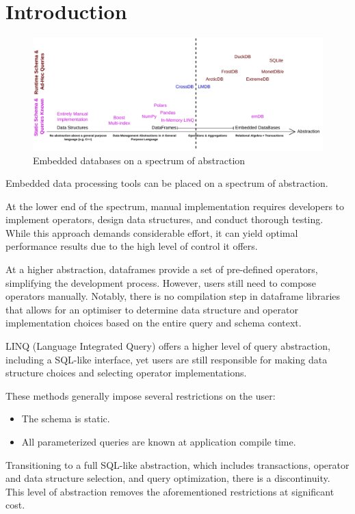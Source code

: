 \documentclass[conference]{IEEEtran}
\begin{document}
\section{Introduction}

\begin{figure}[b]
    \centering
    \includegraphics[width=\textwidth]{_diagrams/problem_space.pdf}
    \caption{Embedded databases on a spectrum of abstraction}
    \label{fig:abstraction-spectrum}
\end{figure}

Embedded data processing tools can be placed on a spectrum of abstraction.

At the lower end of the spectrum, manual implementation requires developers to implement operators,
design data structures, and conduct thorough testing. While this approach demands considerable effort,
it can yield optimal performance results due to the high level of control it offers.

At a higher abstraction, dataframes provide a set of pre-defined operators, simplifying the development
process. However, users still need to compose operators manually. Notably, there is no compilation
step in dataframe libraries that allows for an optimiser to determine data structure and operator implementation choices
based on the entire query and schema context.

LINQ (Language Integrated Query) offers a higher level of query abstraction, including a SQL-like
interface, yet users are still responsible for making data structure choices and selecting operator
implementations.

These methods generally impose several restrictions on the user:
\begin{itemize}
    \item The schema is static.
    \item All parameterized queries are known at application compile time.
\end{itemize}

Transitioning to a full SQL-like abstraction, which includes transactions, operator and data structure
selection, and query optimization, there is a discontinuity. This level of abstraction
removes the aforementioned restrictions at significant cost.
\end{document}
